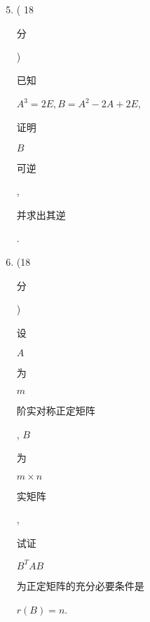 \documentclass[10pt]{article}
\begin{document}
\begin{enumerate}
  \setcounter{enumi}{4}
  \item ( 18 \begin{CJK}{UTF8}{mj}分\end{CJK}) \begin{CJK}{UTF8}{mj}已知\end{CJK} $A^{3}=2 E, B=A^{2}-2 A+2 E$, \begin{CJK}{UTF8}{mj}证明\end{CJK} $B$ \begin{CJK}{UTF8}{mj}可逆\end{CJK}, \begin{CJK}{UTF8}{mj}并求出其逆\end{CJK}.

  \item (18 \begin{CJK}{UTF8}{mj}分\end{CJK}) \begin{CJK}{UTF8}{mj}设\end{CJK} $A$ \begin{CJK}{UTF8}{mj}为\end{CJK} $m$ \begin{CJK}{UTF8}{mj}阶实对称正定矩阵\end{CJK}, $B$ \begin{CJK}{UTF8}{mj}为\end{CJK} $m \times n$ \begin{CJK}{UTF8}{mj}实矩阵\end{CJK}, \begin{CJK}{UTF8}{mj}试证\end{CJK} $B^{T} A B$ \begin{CJK}{UTF8}{mj}为正定矩阵的充分必要条件是\end{CJK} $r(B)=n$.


\end{enumerate}
\end{document}
